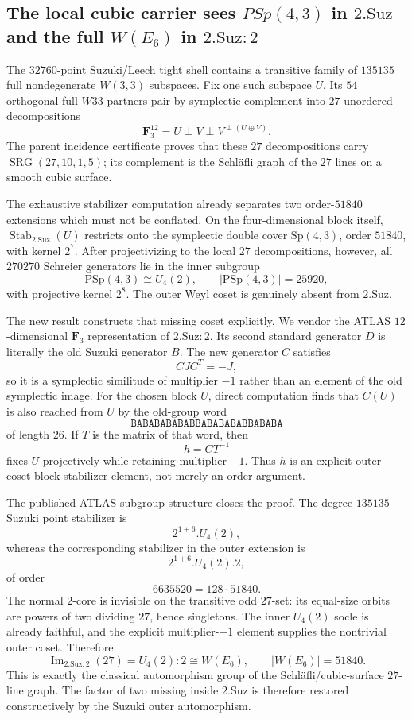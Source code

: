 \subsection{The local cubic carrier sees $PSp(4,3)$ in $2.\mathrm{Suz}$ and the full $W(E_6)$ in $2.\mathrm{Suz}{:}2$}
\label{sec:20260917-suzuki-local-e6-outer}

The $32760$-point Suzuki/Leech tight shell contains a transitive family of
$135135$ full nondegenerate $W(3,3)$ subspaces.  Fix one such subspace $U$.
Its $54$ orthogonal full-$W33$ partners pair by symplectic complement into
$27$ unordered decompositions
\[
   \mathbf F_3^{12}=U\perp V\perp V^{\perp(U\oplus V)}.
\]
The parent incidence certificate proves that these $27$ decompositions carry
$\operatorname{SRG}(27,10,1,5)$; its complement is the Schl\"afli graph of the
$27$ lines on a smooth cubic surface.

The exhaustive stabilizer computation already separates two order-$51840$
extensions which must not be conflated.  On the four-dimensional block itself,
$\operatorname{Stab}_{2.\mathrm{Suz}}(U)$ restricts onto the symplectic double
cover $\mathrm{Sp}(4,3)$, order $51840$, with kernel $2^7$.  After
projectivizing to the local $27$ decompositions, however, all $270270$
Schreier generators lie in the inner subgroup
\[
  \boxed{\mathrm{PSp}(4,3)\cong U_4(2)},\qquad |\mathrm{PSp}(4,3)|=25920,
\]
with projective kernel $2^8$.  The outer Weyl coset is genuinely absent from
$2.\mathrm{Suz}$.

The new result constructs that missing coset explicitly.  We vendor the ATLAS
$12$-dimensional $\mathbf F_3$ representation of $2.\mathrm{Suz}{:}2$.
Its second standard generator $D$ is literally the old Suzuki generator $B$.
The new generator $C$ satisfies
\[
  CJC^T=-J,
\]
so it is a symplectic similitude of multiplier $-1$ rather than an element of
the old symplectic image.  For the chosen block $U$, direct computation finds
that $C(U)$ is also reached from $U$ by the old-group word
\[
 \boxed{\texttt{BABABABABABBABABABABBABABA}}
\]
of length $26$.  If $T$ is the matrix of that word, then
\[
   h=CT^{-1}
\]
fixes $U$ projectively while retaining multiplier $-1$.  Thus $h$ is an
explicit outer-coset block-stabilizer element, not merely an order argument.

The published ATLAS subgroup structure closes the proof.  The degree-$135135$
Suzuki point stabilizer is
\[
  2^{1+6}.U_4(2),
\]
whereas the corresponding stabilizer in the outer extension is
\[
  2^{1+6}.U_4(2).2,
\]
of order
\[
  6635520=128\cdot51840.
\]
The normal $2$-core is invisible on the transitive odd $27$-set: its equal-size
orbits are powers of two dividing $27$, hence singletons.  The inner
$U_4(2)$ socle is already faithful, and the explicit multiplier-$-1$ element
supplies the nontrivial outer coset.  Therefore
\[
  \boxed{\operatorname{Im}_{2.\mathrm{Suz}:2}(27)=U_4(2){:}2
         \cong W(E_6),\qquad |W(E_6)|=51840.}
\]
This is exactly the classical automorphism group of the Schl\"afli/cubic-surface
$27$-line graph.  The factor of two missing inside $2.\mathrm{Suz}$ is therefore
restored constructively by the Suzuki outer automorphism.

